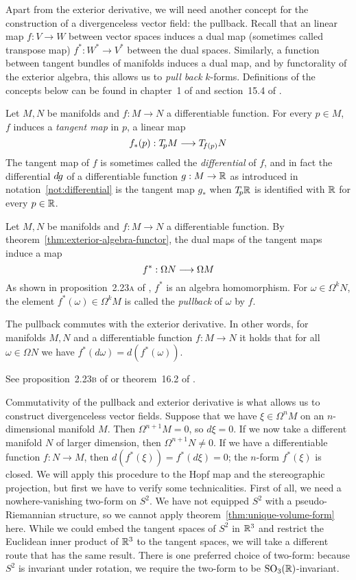 Apart from the exterior derivative,
we will need another concept for the construction of a divergenceless vector field:
the pullback.
Recall that an linear map $f : V \to W$ between vector spaces
induces a dual map (sometimes called transpose map)
$f^* : W^* \to V^*$ between the dual spaces.
Similarly, a function between tangent bundles of manifolds induces a dual map,
and by functorality of the exterior algebra,
this allows us to \emph{pull back} $k$-forms.
Definitions of the concepts below
can be found in chapter~1 of \parencite[p.~16]{warner1971}
and section~15.4 of \parencite[p.~426]{szekeres2004}.

\notation
Let $M, N$ be manifolds and $f : M \to N$ a differentiable function.
For every $p \in M$, $f$ induces a \emph{tangent map} in $p$,
a linear map
\[ f_*(p) : T_{\!p} M \longrightarrow T_{\!f(p)} N \]
The tangent map of $f$ is sometimes called the \emph{differential} of $f\!$,
and in fact the differential $d\hspace{-1pt}g$ of a differentiable function $g : M \to \mathbb{R}$
as introduced in notation~\ref{not:differential} is the tangent map $g_*$
when $T_{\!p}\mathbb{R}$ is identified with $\mathbb{R}$ for every $p \in \mathbb{R}$.

Let $M, N$ be manifolds and $f : M \to N$ a differentiable function.
By theorem~\ref{thm:exterior-algebra-functor},
the dual maps of the tangent maps induce a map
\[ f^* : \Omega N \longrightarrow \Omega M \]
As shown in proposition~2.23\textsc{a} of \parencite[p.~68]{warner1971},
$f^*$ is an algebra homomorphism.
For $\omega \in \Omega^k N$,
the element $f^*(\omega) \in \Omega^k M$ is called
the \emph{pullback} of $\omega$ by $f$.

\theorem
The pullback commutes with the exterior derivative.
In other words,
for manifolds $M, N$ and a differentiable function $f: M \to N$
it holds that for all $\omega \in \Omega N$ we have $f^*(d\omega) = d(f^*(\omega))$.

\proof
See proposition~2.23\textsc{b} of \parencite[p.~68]{warner1971}
or theorem~16.2 of \parencite[p.~451]{szekeres2004}.

Commutativity of the pullback and exterior derivative is what allows
us to construct divergenceless vector fields.
Suppose that we have $\xi \in \Omega^n M$
on an $n$-dimensional manifold $M$.
Then $\Omega^{n + 1} M = 0$,
so $d\xi = 0$.
If we now take a different manifold $N$ of larger dimension,
then $\Omega^{n + 1} N \neq 0$.
If we have a differentiable function $f : N \to M$,
then $d(f^*(\xi)) = f^*(d\xi) = 0$;
the $n$-form $f^*(\xi)$ is closed.
We will apply this procedure to the Hopf map and the stereographic projection,
but first we have to verify some technicalities.
First of all, we need a nowhere-vanishing two-form on $S^2\!$.
We have not equipped $S^2$ with a pseudo-Riemannian structure,
so we cannot apply theorem~\ref{thm:unique-volume-form} here.
While we could embed the tangent spaces of $S^2$ in $\mathbb{R}^3$
and restrict the Euclidean inner product of $\mathbb{R}^3$ to the tangent spaces,
we will take a different route that has the same result.
There is one preferred choice of two-form:
because $S^2$ is invariant under rotation,
we require the two-form to be $\operatorname{SO}_3(\mathbb{R})$-invariant.

